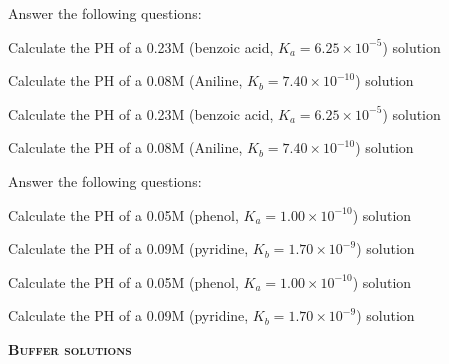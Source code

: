\documentclass[main.tex]{subfiles}
\begin{document}
\begin{multicols*}{2}
\begin{question}[ID=\the\value{numA}]
Answer the following questions:
\begin{inparaenum}[(a)]
\item Calculate the PH of a 0.23M  (benzoic acid, $K_a=6.25 \times 10^{-5}$) solution %
\item Calculate the PH of a 0.08M 	 (Aniline, $K_b=7.40 \times 10^{-10}$) solution %
 \end{inparaenum}
\end{question}
\begin{solution}
\begin{inparaenum}[(a)]
\item Calculate the PH of a 0.23M  (benzoic acid, $K_a=6.25 \times 10^{-5}$) solution %
\item Calculate the PH of a 0.08M 	 (Aniline, $K_b=7.40 \times 10^{-10}$) solution %
 \end{inparaenum}
\hspace{0.1cm}\end{solution}%

\begin{question}[ID=\the\value{numA}]
Answer the following questions:
\begin{inparaenum}[(a)]
\item Calculate the PH of a 0.05M  (phenol, $K_a=1.00 \times 10^{-10}$) solution %
\item Calculate the PH of a 0.09M 	 (pyridine, $K_b=1.70 \times 10^{-9}$) solution %
 \end{inparaenum}
\end{question}
\begin{solution}
\begin{inparaenum}[(a)]
\item Calculate the PH of a 0.05M  (phenol, $K_a=1.00 \times 10^{-10}$) solution %
\item Calculate the PH of a 0.09M 	 (pyridine, $K_b=1.70 \times 10^{-9}$) solution %
 \end{inparaenum}
\hspace{0.1cm}\end{solution}%


			
{\raggedright\textsc{\textbf{Buffer solutions}}\par}



\end{multicols*}
\end{document}
